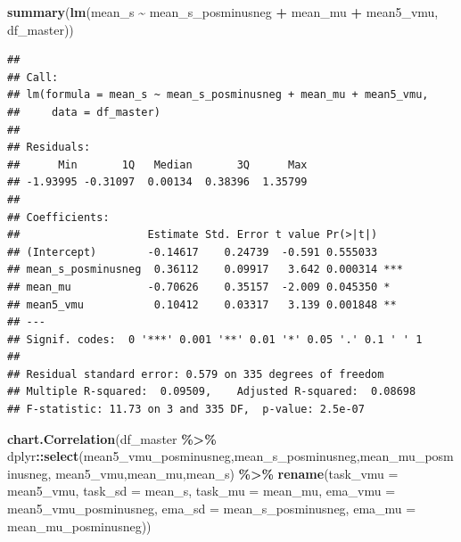 \documentclass[
]{article}
\newenvironment{Shaded}{\begin{snugshade}}{\end{snugshade}}
\newcommand{\AttributeTok}[1]{\textcolor[rgb]{0.13,0.29,0.53}{#1}}
\newcommand{\FunctionTok}[1]{\textcolor[rgb]{0.13,0.29,0.53}{\textbf{#1}}}
\newcommand{\NormalTok}[1]{#1}
\newcommand{\SpecialCharTok}[1]{\textcolor[rgb]{0.81,0.36,0.00}{\textbf{#1}}}
\begin{document}
\begin{Shaded}
\begin{Highlighting}[]
\FunctionTok{summary}\NormalTok{(}\FunctionTok{lm}\NormalTok{(mean\_s }\SpecialCharTok{\textasciitilde{}}\NormalTok{ mean\_s\_posminusneg }\SpecialCharTok{+}\NormalTok{ mean\_mu }\SpecialCharTok{+}\NormalTok{ mean5\_vmu, df\_master))}
\end{Highlighting}
\end{Shaded}

\begin{verbatim}
## 
## Call:
## lm(formula = mean_s ~ mean_s_posminusneg + mean_mu + mean5_vmu, 
##     data = df_master)
## 
## Residuals:
##      Min       1Q   Median       3Q      Max 
## -1.93995 -0.31097  0.00134  0.38396  1.35799 
## 
## Coefficients:
##                    Estimate Std. Error t value Pr(>|t|)    
## (Intercept)        -0.14617    0.24739  -0.591 0.555033    
## mean_s_posminusneg  0.36112    0.09917   3.642 0.000314 ***
## mean_mu            -0.70626    0.35157  -2.009 0.045350 *  
## mean5_vmu           0.10412    0.03317   3.139 0.001848 ** 
## ---
## Signif. codes:  0 '***' 0.001 '**' 0.01 '*' 0.05 '.' 0.1 ' ' 1
## 
## Residual standard error: 0.579 on 335 degrees of freedom
## Multiple R-squared:  0.09509,    Adjusted R-squared:  0.08698 
## F-statistic: 11.73 on 3 and 335 DF,  p-value: 2.5e-07
\end{verbatim}

\begin{Shaded}
\begin{Highlighting}[]
\FunctionTok{chart.Correlation}\NormalTok{(df\_master }\SpecialCharTok{\%\textgreater{}\%} 
\NormalTok{                    dplyr}\SpecialCharTok{::}\FunctionTok{select}\NormalTok{(mean5\_vmu\_posminusneg,mean\_s\_posminusneg,mean\_mu\_posminusneg, }
\NormalTok{                                 mean5\_vmu,mean\_mu,mean\_s) }\SpecialCharTok{\%\textgreater{}\%} 
                    \FunctionTok{rename}\NormalTok{(}\AttributeTok{task\_vmu =}\NormalTok{ mean5\_vmu,}
                           \AttributeTok{task\_sd =}\NormalTok{ mean\_s,}
                           \AttributeTok{task\_mu =}\NormalTok{ mean\_mu,}
                           \AttributeTok{ema\_vmu =}\NormalTok{ mean5\_vmu\_posminusneg,}
                           \AttributeTok{ema\_sd =}\NormalTok{ mean\_s\_posminusneg,}
                           \AttributeTok{ema\_mu =}\NormalTok{ mean\_mu\_posminusneg))}
\end{Highlighting}
\end{Shaded}
\end{document}
